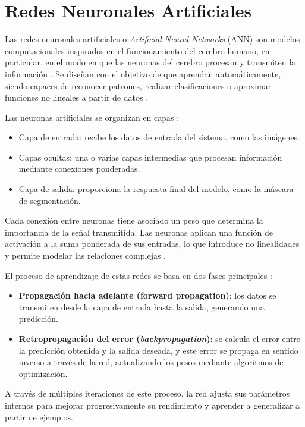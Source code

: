 \section{Redes Neuronales Artificiales}
Las redes neuronales artificiales o \textit{Artificial Neural Networks} (ANN) son modelos computacionales inspirados en el funcionamiento del cerebro humano, en particular, en el modo en que las neuronas del cerebro procesan y transmiten la información \cite{ann2004}. Se diseñan con el objetivo de que aprendan automáticamente, siendo capaces de reconocer patrones, realizar clasificaciones o aproximar funciones no lineales a partir de datos \cite{deeplearning2016}.

Las neuronas artificiales se organizan en capas \cite{ann2004}:
\begin{itemize}
    \item Capa de entrada: recibe los datos de entrada del sistema, como las imágenes.
    \item Capas ocultas: una o varias capas intermedias que procesan información mediante conexiones ponderadas.
    \item Capa de salida: proporciona la respuesta final del modelo, como la máscara de segmentación.
\end{itemize}
Cada conexión entre neuronas tiene asociado un peso que determina la importancia de la señal transmitida. Las neuronas aplican una función de activación a la suma ponderada de sus entradas, lo que introduce no linealidades y permite modelar las relaciones complejas \cite{deeplearning2016}.

El proceso de aprendizaje de estas redes se basa en dos fases principales \cite{deeplearning2016}:
\begin{itemize}
    \item \textbf{Propagación hacia adelante (forward propagation)}: los datos se transmiten desde la capa de entrada hasta la salida, generando una predicción.
    \item \textbf{Retropropagación del error (\textit{backpropagation})}: se calcula el error entre la predicción obtenida y la salida deseada, y este error se propaga en sentido inverso a través de la red, actualizando los pesos mediante algoritmos de optimización.
\end{itemize}

A través de múltiples iteraciones de este proceso, la red ajusta sus parámetros internos para mejorar progresivamente su rendimiento y aprender a generalizar a partir de ejemplos.

